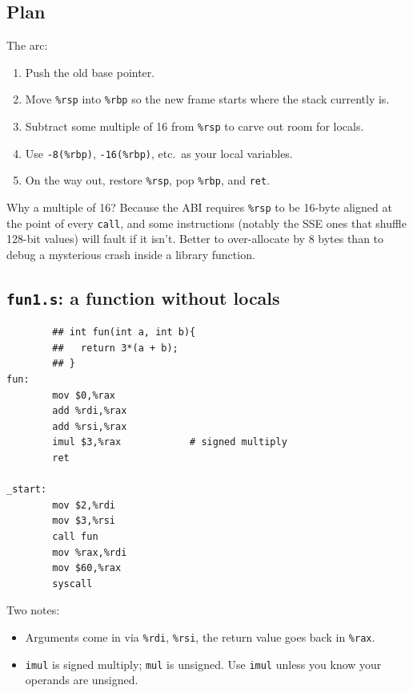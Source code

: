 \documentclass[11pt]{article}
\begin{document}
\subsection*{Plan}

The arc:
\begin{enumerate}
  \item Push the old base pointer.
  \item Move \texttt{\%rsp} into \texttt{\%rbp} so the new frame
    starts where the stack currently is.
  \item Subtract some multiple of 16 from \texttt{\%rsp} to carve
    out room for locals.
  \item Use \texttt{-8(\%rbp)}, \texttt{-16(\%rbp)}, etc.\ as your
    local variables.
  \item On the way out, restore \texttt{\%rsp}, pop \texttt{\%rbp},
    and \texttt{ret}.
\end{enumerate}

Why a multiple of 16? Because the ABI requires \texttt{\%rsp} to be
16-byte aligned at the point of every \texttt{call}, and some
instructions (notably the SSE ones that shuffle 128-bit values) will
fault if it isn't. Better to over-allocate by 8 bytes than to debug
a mysterious crash inside a library function.

\subsection*{\texttt{fun1.s}: a function without locals}

\begin{lstlisting}
        ## int fun(int a, int b){
        ##   return 3*(a + b);
        ## }
fun:
        mov $0,%rax
        add %rdi,%rax
        add %rsi,%rax
        imul $3,%rax            # signed multiply
        ret

_start:
        mov $2,%rdi
        mov $3,%rsi
        call fun
        mov %rax,%rdi
        mov $60,%rax
        syscall
\end{lstlisting}

Two notes:
\begin{itemize}
  \item Arguments come in via \texttt{\%rdi}, \texttt{\%rsi}, the
    return value goes back in \texttt{\%rax}.
  \item \texttt{imul} is signed multiply; \texttt{mul} is unsigned.
    Use \texttt{imul} unless you know your operands are unsigned.
\end{itemize}
\end{document}
